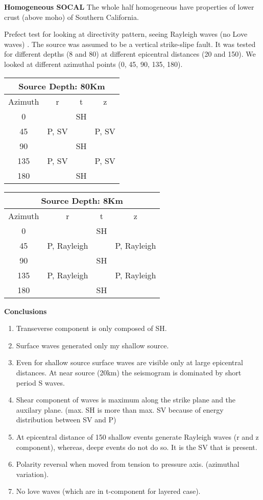 \documentclass[11pt,titlepage,fleqn]{article}
\begin{document}
{\bf Homogeneous SOCAL}
The whole half homogeneous have properties of lower crust (above moho) of Southern California.

Prefect test for looking at directivity pattern, seeing Rayleigh waves (no Love waves) . The source was assumed to be a vertical strike-slipe fault. It was tested for different depths (8 and 80) at different epicentral distances (20 and 150). We looked at different azimuthal points (0, 45, 90, 135, 180).

\begin{center}
\begin{tabular}{|c|c|c|c|}
\hline
\multicolumn{4}{|c|}{\bf Source Depth: 80Km} \\
\hline
Azimuth & r & t & z\\
\hline
0 & &SH& \\
45 & P, SV & & P, SV\\
90 & & SH & \\
135 & P, SV & & P, SV\\
180 & & SH & \\
\hline
\end{tabular}
\begin{tabular}{|c|c|c|c|}
\hline
\multicolumn{4}{|c|}{\bf Source Depth: 8Km} \\
\hline
Azimuth & r & t & z\\
\hline
0 & &SH& \\
45 & P, Rayleigh & & P, Rayleigh\\
90 & & SH & \\
135 & P, Rayleigh & & P, Rayleigh\\
180 & & SH & \\ 
\hline
\end{tabular}
\end{center}

{\bf Conclusions}
\begin{enumerate}
\item Transeverse component is only composed of SH.
\item Surface waves generated only my shallow source.
\item Even for shallow source surface waves are visible only at large epicentral distances. At near source (20km) the seismogram is dominated by short period S waves.
\item Shear component of waves is maximum along the strike plane and the auxilary plane. (max. SH is more than max. SV because of energy distribution between SV and P) 
\item At epicentral distance of 150 shallow events generate Rayleigh waves (r and z component), whereas, deepr events do not do so. It is the SV that is present.
\item Polarity reversal when moved from tension to pressure axis. (azimuthal variation).
\item No love waves (which are in t-component for layered case).
\end{enumerate}
\end{document}
